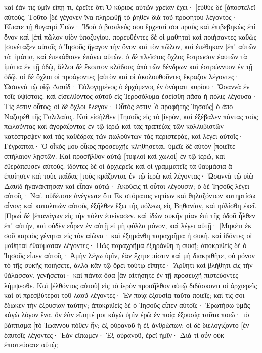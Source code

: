 καὶ ἐάν τις ὑμῖν εἴπῃ τι, ἐρεῖτε ὅτι Ὁ κύριος αὐτῶν χρείαν ἔχει· [εὐθὺς δὲ [ἀποστελεῖ αὐτούς. 
Τοῦτο [δὲ γέγονεν ἵνα πληρωθῇ τὸ ῥηθὲν διὰ τοῦ προφήτου λέγοντος· 
Εἴπατε τῇ θυγατρὶ Σιών· Ἰδοὺ ὁ βασιλεύς σου ἔρχεταί σοι πραῢς καὶ ἐπιβεβηκὼς ἐπὶ ὄνον καὶ [ἐπὶ πῶλον υἱὸν ὑποζυγίου. 
πορευθέντες δὲ οἱ μαθηταὶ καὶ ποιήσαντες καθὼς [συνέταξεν αὐτοῖς ὁ Ἰησοῦς 
ἤγαγον τὴν ὄνον καὶ τὸν πῶλον, καὶ ἐπέθηκαν [ἐπ᾽ αὐτῶν τὰ [ἱμάτια, καὶ ἐπεκάθισεν ἐπάνω αὐτῶν. 
ὁ δὲ πλεῖστος ὄχλος ἔστρωσαν ἑαυτῶν τὰ ἱμάτια ἐν τῇ ὁδῷ, ἄλλοι δὲ ἔκοπτον κλάδους ἀπὸ τῶν δένδρων καὶ ἐστρώννυον ἐν τῇ ὁδῷ. 
οἱ δὲ ὄχλοι οἱ προάγοντες [αὐτὸν καὶ οἱ ἀκολουθοῦντες ἔκραζον λέγοντες· Ὡσαννὰ τῷ υἱῷ Δαυίδ· Εὐλογημένος ὁ ἐρχόμενος ἐν ὀνόματι κυρίου· Ὡσαννὰ ἐν τοῖς ὑψίστοις. 
καὶ εἰσελθόντος αὐτοῦ εἰς Ἱεροσόλυμα ἐσείσθη πᾶσα ἡ πόλις λέγουσα· Τίς ἐστιν οὗτος; 
οἱ δὲ ὄχλοι ἔλεγον· Οὗτός ἐστιν [ὁ προφήτης Ἰησοῦς] ὁ ἀπὸ Ναζαρὲθ τῆς Γαλιλαίας. 
Καὶ εἰσῆλθεν [Ἰησοῦς εἰς τὸ [ἱερόν, καὶ ἐξέβαλεν πάντας τοὺς πωλοῦντας καὶ ἀγοράζοντας ἐν τῷ ἱερῷ καὶ τὰς τραπέζας τῶν κολλυβιστῶν κατέστρεψεν καὶ τὰς καθέδρας τῶν πωλούντων τὰς περιστεράς, 
καὶ λέγει αὐτοῖς· Γέγραπται· Ὁ οἶκός μου οἶκος προσευχῆς κληθήσεται, ὑμεῖς δὲ αὐτὸν [ποιεῖτε σπήλαιον λῃστῶν. 
Καὶ προσῆλθον αὐτῷ [τυφλοὶ καὶ χωλοὶ] ἐν τῷ ἱερῷ, καὶ ἐθεράπευσεν αὐτούς. 
ἰδόντες δὲ οἱ ἀρχιερεῖς καὶ οἱ γραμματεῖς τὰ θαυμάσια ἃ ἐποίησεν καὶ τοὺς παῖδας [τοὺς κράζοντας ἐν τῷ ἱερῷ καὶ λέγοντας· Ὡσαννὰ τῷ υἱῷ Δαυίδ ἠγανάκτησαν 
καὶ εἶπαν αὐτῷ· Ἀκούεις τί οὗτοι λέγουσιν; ὁ δὲ Ἰησοῦς λέγει αὐτοῖς· Ναί. οὐδέποτε ἀνέγνωτε ὅτι Ἐκ στόματος νηπίων καὶ θηλαζόντων κατηρτίσω αἶνον; 
καὶ καταλιπὼν αὐτοὺς ἐξῆλθεν ἔξω τῆς πόλεως εἰς Βηθανίαν, καὶ ηὐλίσθη ἐκεῖ. 
[Πρωῒ δὲ [ἐπανάγων εἰς τὴν πόλιν ἐπείνασεν. 
καὶ ἰδὼν συκῆν μίαν ἐπὶ τῆς ὁδοῦ ἦλθεν ἐπ᾽ αὐτήν, καὶ οὐδὲν εὗρεν ἐν αὐτῇ εἰ μὴ φύλλα μόνον, καὶ λέγει αὐτῇ· [Μηκέτι ἐκ σοῦ καρπὸς γένηται εἰς τὸν αἰῶνα· καὶ ἐξηράνθη παραχρῆμα ἡ συκῆ. 
καὶ ἰδόντες οἱ μαθηταὶ ἐθαύμασαν λέγοντες· Πῶς παραχρῆμα ἐξηράνθη ἡ συκῆ; 
ἀποκριθεὶς δὲ ὁ Ἰησοῦς εἶπεν αὐτοῖς· Ἀμὴν λέγω ὑμῖν, ἐὰν ἔχητε πίστιν καὶ μὴ διακριθῆτε, οὐ μόνον τὸ τῆς συκῆς ποιήσετε, ἀλλὰ κἂν τῷ ὄρει τούτῳ εἴπητε· Ἄρθητι καὶ βλήθητι εἰς τὴν θάλασσαν, γενήσεται· 
καὶ πάντα ὅσα [ἂν αἰτήσητε ἐν τῇ προσευχῇ πιστεύοντες λήμψεσθε. 
Καὶ [ἐλθόντος αὐτοῦ] εἰς τὸ ἱερὸν προσῆλθον αὐτῷ διδάσκοντι οἱ ἀρχιερεῖς καὶ οἱ πρεσβύτεροι τοῦ λαοῦ λέγοντες· Ἐν ποίᾳ ἐξουσίᾳ ταῦτα ποιεῖς; καὶ τίς σοι ἔδωκεν τὴν ἐξουσίαν ταύτην; 
ἀποκριθεὶς δὲ ὁ Ἰησοῦς εἶπεν αὐτοῖς· Ἐρωτήσω ὑμᾶς κἀγὼ λόγον ἕνα, ὃν ἐὰν εἴπητέ μοι κἀγὼ ὑμῖν ἐρῶ ἐν ποίᾳ ἐξουσίᾳ ταῦτα ποιῶ· 
τὸ βάπτισμα [τὸ Ἰωάννου πόθεν ἦν; ἐξ οὐρανοῦ ἢ ἐξ ἀνθρώπων; οἱ δὲ διελογίζοντο [ἐν ἑαυτοῖς λέγοντες· Ἐὰν εἴπωμεν· Ἐξ οὐρανοῦ, ἐρεῖ ἡμῖν· Διὰ τί οὖν οὐκ ἐπιστεύσατε αὐτῷ; 
